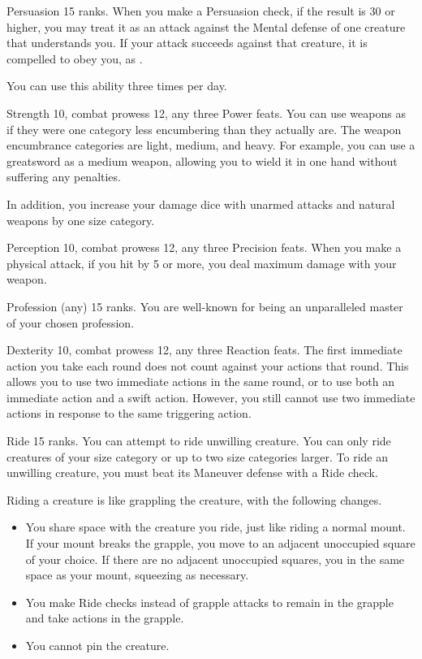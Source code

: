 \featpre Persuasion 15 ranks.
\featben When you make a Persuasion check, if the result is 30 or higher, you may treat it as an attack against the Mental defense of one creature that understands you.
If your attack succeeds against that creature, it is compelled to obey you, as .

You can use this ability three times per day.

\featpres Strength 10, combat prowess 12, any three Power feats.
\featben You can use weapons as if they were one category less encumbering than they actually are.
The weapon encumbrance categories are light, medium, and heavy.
For example, you can use a greatsword as a medium weapon, allowing you to wield it in one hand without suffering any penalties.

In addition, you increase your damage dice with unarmed attacks and natural weapons by one size category.

\featpres Perception 10, combat prowess 12, any three Precision feats.
\featben When you make a physical attack, if you hit by 5 or more, you deal maximum damage with your weapon.

\featpre Profession (any) 15 ranks.
\featben You are well-known for being an unparalleled master of your chosen profession.

\featpres Dexterity 10, combat prowess 12, any three Reaction feats.
\featben The first immediate action you take each round does not count against your actions that round.
This allows you to use two immediate actions in the same round, or to use both an immediate action and a swift action.
However, you still cannot use two immediate actions in response to the same triggering action.

\featpre Ride 15 ranks.
\featben You can attempt to ride unwilling creature.
You can only ride creatures of your size category or up to two size categories larger.
To ride an unwilling creature, you must beat its Maneuver defense with a Ride check.

Riding a creature is like grappling the creature, with the following changes.
\begin{itemize}
    \item You share space with the creature you ride, just like riding a normal mount.
        If your mount breaks the grapple, you move to an adjacent unoccupied square of your choice.
        If there are no adjacent unoccupied squares, you in the same space as your mount, squeezing as necessary.
    \item You make Ride checks instead of grapple attacks to remain in the grapple and take actions in the grapple.
    \item You cannot pin the creature.
\end{itemize}

